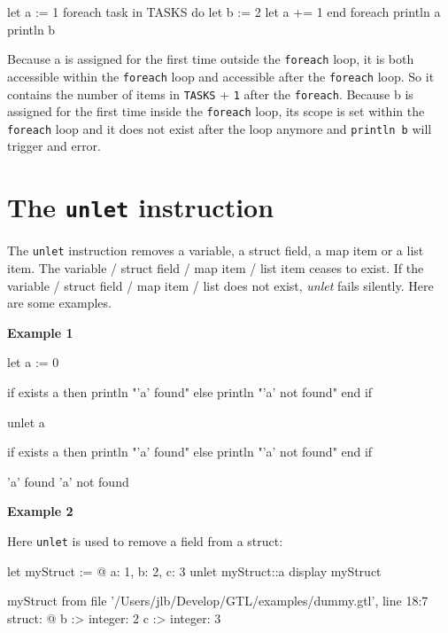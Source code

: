 \documentclass[10pt,openright,twosides,final]{memoir}
\newcommand{\gtlinline}[1]{\colorbox{light-blue}{\lstinline[language=gtl]{#1}}}
\newcommand{\examplen}[1]{\vspace{.75em}\noindent\textbf{Example #1}\vspace{0em}}
\begin{document}
\begin{gtl}
let a := 1
foreach task in TASKS do
  let b := 2
  let a += 1
end foreach
println a
println b
\end{gtl}

Because a is assigned for the first time outside the \gtlinline{foreach} loop, it is both accessible within the \gtlinline{foreach} loop and accessible after the \gtlinline{foreach} loop. So it contains the number of items in \gtlinline{TASKS} + \gtlinline{1} after the \gtlinline{foreach}. Because b is assigned for the first time inside the \gtlinline{foreach} loop, its scope is set within the \gtlinline{foreach} loop and it does not exist after the loop anymore and \gtlinline{println b} will trigger and error.


\section{The \texttt{unlet} instruction}

The \gtlinline{unlet} instruction removes a variable, a struct field, a map item or a list item. The variable / struct field / map item / list item ceases to exist. If the variable / struct field / map item / list does not exist, {\em unlet} fails silently. Here are some examples.

\examplen{1}
\begin{gtl}
let a := 0

if exists a then
  println "'a' found"
else
  println "'a' not found"
end if

unlet a

if exists a then
  println "'a' found"
else
  println "'a' not found"
end if
\end{gtl}

\begin{console}
'a' found
'a' not found
\end{console}


\examplen{2}

\noindent Here \gtlinline{unlet} is used to remove a field from a struct:

\begin{gtl}
let myStruct := @{ a: 1, b: 2, c: 3 }
unlet myStruct::a
display myStruct
\end{gtl} 

\begin{console}
myStruct from file '/Users/jlb/Develop/GTL/examples/dummy.gtl', line 18:7
    struct: @{
        b :>
            integer: 2
        c :>
            integer: 3
    }
\end{console}
\end{document}

